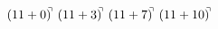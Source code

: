 \documentclass[preview]{standalone}
\begin{document}
\begin{align*}
(11+0)^{\hspace{-0.1cm}\urcorner} \ (11+3)^{\hspace{-0.1cm}\urcorner} \ (11+7)^{\hspace{-0.1cm}\urcorner} \ (11+10)^{\hspace{-0.1cm}\urcorner}
\end{align*}
\end{document}
